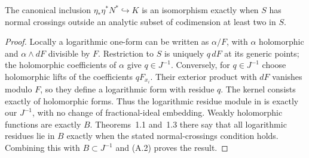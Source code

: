 
\begin{proposition}\label{cdp:st:A.2.3}
The canonical inclusion $\eta_*\eta^*N^*\hookrightarrow K$ is an isomorphism exactly when $S$ has normal crossings outside an analytic subset of codimension at least two in $S$.
\end{proposition}
\begin{proof}
Locally a logarithmic one-form can be written as $\alpha/F$, with $\alpha$ holomorphic and $\alpha\wedge dF$ divisible by $F$. Restriction to $S$ is uniquely $q\,dF$ at its generic points; the holomorphic coefficients of $\alpha$ give $q\in J^{-1}$. Conversely, for $q\in J^{-1}$ choose holomorphic lifts of the coefficients $qF_{x_i}$. Their exterior product with $dF$ vanishes modulo $F$, so they define a logarithmic form with residue $q$. The kernel consists exactly of holomorphic forms. Thus the logarithmic residue module in \cite[Proposition~3.4]{GS2014} is exactly our $J^{-1}$, with no change of fractional-ideal embedding. Weakly holomorphic functions are exactly $B$. Theorems~1.1 and~1.3 there say that all logarithmic residues lie in $B$ exactly when the stated normal-crossings condition holds. Combining this with $B\subset J^{-1}$ and (A.2) proves the result.
\end{proof}


